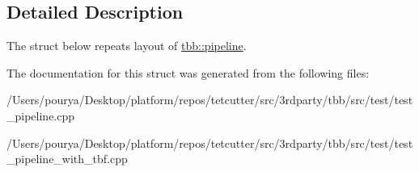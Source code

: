 \subsection{Detailed Description}
The struct below repeats layout of \hyperlink{classtbb_1_1pipeline}{tbb\+::pipeline}. 

The documentation for this struct was generated from the following files\+:\begin{DoxyCompactItemize}
\item 
/\+Users/pourya/\+Desktop/platform/repos/tetcutter/src/3rdparty/tbb/src/test/test\+\_\+pipeline.\+cpp\item 
/\+Users/pourya/\+Desktop/platform/repos/tetcutter/src/3rdparty/tbb/src/test/test\+\_\+pipeline\+\_\+with\+\_\+tbf.\+cpp\end{DoxyCompactItemize}
